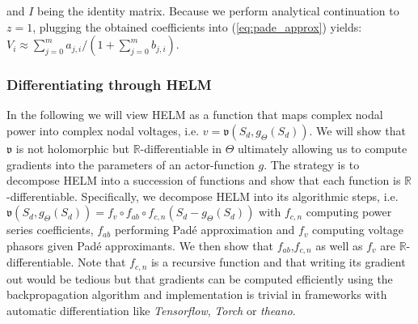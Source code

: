  and $I$ being the identity matrix. Because we perform analytical continuation to $z=1$, plugging the obtained coefficients into (\ref{eq:pade_approx}) yields: $V_i \approx \sum_{j=0}^m a_{j,i} / (1+\sum_{j=0}^m b_{j,i})$.

\subsubsection{Differentiating through HELM}
In the following we will view HELM as a function that maps complex nodal power into complex nodal voltages, i.e. $v = \mathfrak{v}(S_d,g_\Theta(S_d))$. We will show that $\mathfrak{v}$ is not holomorphic but $\mathbb{R}$-differentiable in $\Theta$ ultimately allowing us to compute gradients into the parameters of an actor-function $g$. The strategy is to decompose HELM into a succession of functions and show that each function is $\mathbb{R}$-differentiable. Specifically, we decompose HELM into its algorithmic steps, i.e. $\mathfrak{v}(S_d,g_\Theta(S_d)) = f_v \circ f_{ab} \circ f_{c,n} (S_d-g_\Theta(S_d))$ with $f_{c,n}$ computing power series coefficients, $f_{ab}$ performing Pad\'e approximation and $f_v$ computing voltage phasors given Pad\'e approximants. We then show that $f_{ab}$,$f_{c,n}$ as well as $f_{v}$ are $\mathbb{R}$-differentiable. Note that $f_{c,n}$ is a recursive function and that writing its gradient out would be tedious but that gradients can be computed efficiently using the backpropagation algorithm and implementation is trivial in frameworks with automatic differentiation like \emph{Tensorflow}, \emph{Torch} or \emph{theano}.

